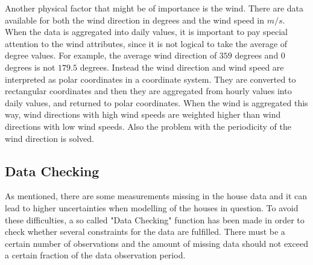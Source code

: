 \noindent Another physical factor that might be of importance is the wind. There are data available for both the wind direction in degrees and the wind speed in $m/s$. When the data is aggregated into daily values, it is important to pay special attention to the wind attributes, since it is not logical to take the average of degree values. For example, the average wind direction of $359$ degrees and $0$ degrees is not $179.5$ degrees. Instead the wind direction and wind speed are interpreted as polar coordinates in a coordinate system. They are converted to rectangular coordinates and then they are aggregated from hourly values into daily values, and returned to polar coordinates.  When the wind is aggregated this way, wind directions with high wind speeds are weighted higher than wind directions with low wind speeds. Also the problem with the periodicity of the wind direction is solved.


\subsection{Data Checking}
As mentioned, there are some measurements missing in the house data and it can lead to higher uncertainties when modelling of the houses in question. To avoid these difficulties, a so called "Data Checking" function has been made in order to check whether several constraints for the data are fulfilled. There must be a certain number of observations and the amount of missing data should not exceed a certain fraction of the data observation period.
